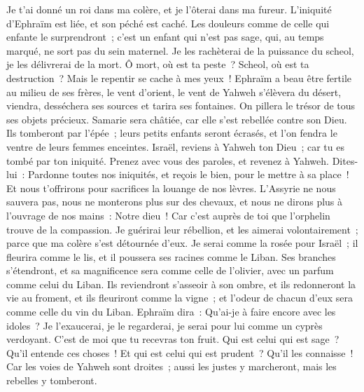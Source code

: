 \begin{multicols}{2}
Je t'ai donné un roi dans ma colère, et je l'ôterai dans ma fureur.
L'iniquité d'Ephraïm est liée, et son péché est caché.
Les douleurs comme de celle qui enfante le surprendront~; c'est un enfant qui n'est pas sage, qui, au temps marqué, ne sort pas du sein maternel.
Je les rachèterai de la puissance du scheol, je les délivrerai de la mort. Ô mort, où est ta peste~? Scheol, où est ta destruction~? Mais le repentir se cache à mes yeux~!
Ephraïm a beau être fertile au milieu de ses frères, le vent d'orient, le vent de Yahweh s'élèvera du désert, viendra, desséchera ses sources et tarira ses fontaines. On pillera le trésor de tous ses objets précieux.
Samarie sera châtiée, car elle s'est rebellée contre son Dieu. Ils tomberont par l'épée~; leurs petits enfants seront écrasés, et l'on fendra le ventre de leurs femmes enceintes.
\VerseOne{}Israël, reviens à Yahweh ton Dieu~; car tu es tombé par ton iniquité.
Prenez avec vous des paroles, et revenez à Yahweh. Dites-lui~: Pardonne toutes nos iniquités, et reçois le bien, pour le mettre à sa place~! Et nous t'offrirons pour sacrifices la louange de nos lèvres.
L'Assyrie ne nous sauvera pas, nous ne monterons plus sur des chevaux, et nous ne dirons plus à l'ouvrage de nos mains~: Notre dieu~! Car c'est auprès de toi que l'orphelin trouve de la compassion.
Je guérirai leur rébellion, et les aimerai volontairement~; parce que ma colère s'est détournée d'eux.
Je serai comme la rosée pour Israël~; il fleurira comme le lis, et il poussera ses racines comme le Liban.
Ses branches s'étendront, et sa magnificence sera comme celle de l'olivier, avec un parfum comme celui du Liban.
Ils reviendront s'asseoir à son ombre, et ils redonneront la vie au froment, et ils fleuriront comme la vigne~; et l'odeur de chacun d'eux sera comme celle du vin du Liban.
Ephraïm dira~: Qu'ai-je à faire encore avec les idoles~? Je l'exaucerai, je le regarderai, je serai pour lui comme un cyprès verdoyant. C'est de moi que tu recevras ton fruit.
Qui est celui qui est sage~? Qu'il entende ces choses~! Et qui est celui qui est prudent~? Qu'il les connaisse~! Car les voies de Yahweh sont droites~; aussi les justes y marcheront, mais les rebelles y tomberont.
\PPE{}
\end{multicols}
